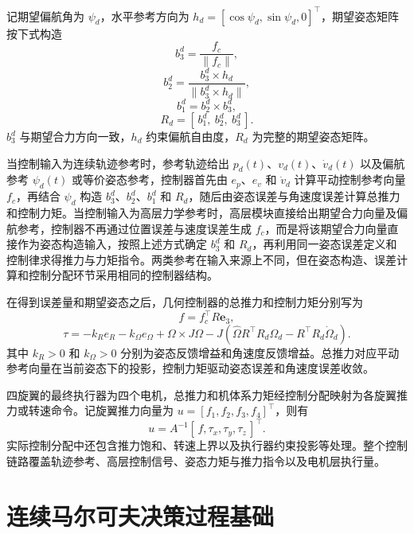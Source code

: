 记期望偏航角为 $\psi_d$，水平参考方向为 $h_d=[\cos\psi_d,\sin\psi_d,0]^\top$，期望姿态矩阵按下式构造
\begin{equation}
    b_3^d=\frac{f_c}{\|f_c\|},
\end{equation}
\begin{equation}
    b_2^d=\frac{b_3^d\times h_d}{\|b_3^d\times h_d\|},
\end{equation}
\begin{equation}
    b_1^d=b_2^d\times b_3^d,
\end{equation}
\begin{equation}
    R_d=[\,b_1^d,\ b_2^d,\ b_3^d\,].
\end{equation}
$b_3^d$ 与期望合力方向一致，$h_d$ 约束偏航自由度，$R_d$ 为完整的期望姿态矩阵。

当控制输入为连续轨迹参考时，参考轨迹给出 $p_d(t)$、$v_d(t)$、$\dot v_d(t)$ 以及偏航参考 $\psi_d(t)$ 或等价姿态参考，控制器首先由 $e_p$、$e_v$ 和 $\dot v_d$ 计算平动控制参考向量 $f_c$，再结合 $\psi_d$ 构造 $b_3^d$、$b_2^d$、$b_1^d$ 和 $R_d$，随后由姿态误差与角速度误差计算总推力和控制力矩。当控制输入为高层力学参考时，高层模块直接给出期望合力向量及偏航参考，控制器不再通过位置误差与速度误差生成 $f_c$，而是将该期望合力向量直接作为姿态构造输入，按照上述方式确定 $b_3^d$ 和 $R_d$，再利用同一姿态误差定义和控制律求得推力与力矩指令。两类参考在输入来源上不同，但在姿态构造、误差计算和控制分配环节采用相同的控制器结构。

在得到误差量和期望姿态之后，几何控制器的总推力和控制力矩分别写为
\begin{equation}
    f=f_c^\top R\mathbf e_3,
\end{equation}
\begin{equation}
    \tau=-k_R e_R-k_\Omega e_\Omega+\Omega\times J\Omega
    -J\left(\hat\Omega R^\top R_d\Omega_d-R^\top R_d\dot\Omega_d\right).
\end{equation}
其中 $k_R>0$ 和 $k_\Omega>0$ 分别为姿态反馈增益和角速度反馈增益。总推力对应平动参考向量在当前姿态下的投影，控制力矩驱动姿态误差和角速度误差收敛。

四旋翼的最终执行器为四个电机，总推力和机体系力矩经控制分配映射为各旋翼推力或转速命令。记旋翼推力向量为 $u=[f_1,f_2,f_3,f_4]^\top$，则有
\begin{equation}
    u=A^{-1}[\,f,\tau_x,\tau_y,\tau_z\,]^\top.
\end{equation}
实际控制分配中还包含推力饱和、转速上界以及执行器约束投影等处理。整个控制链路覆盖轨迹参考、高层控制信号、姿态力矩与推力指令以及电机层执行量。

\section{连续马尔可夫决策过程基础}

